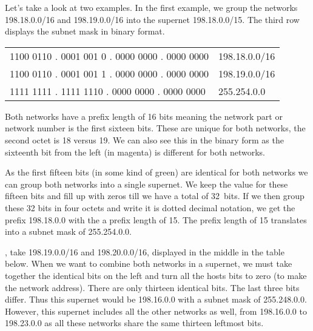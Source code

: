 Let's take a look at two examples.
In the first example, we group the networks 198.18.0.0/16 and 198.19.0.0/16 into the supernet 198.18.0.0/15.
The third row displays the subnet mask in binary format.

\begin{center}
\tosfstyle
\begin{tabular}{@{}l@{\qquad}l@{}}
\color{spot1} 1100 0110 . 0001 001\color{spot2} 0 . 0000 0000 . 0000 0000 & 198.18.0.0/16 \\
\color{spot1} 1100 0110 . 0001 001\color{spot2} 1 . 0000 0000 . 0000 0000 & 198.19.0.0/16 \\
\hline
\textcolor{spot1}{1111 1111 . 1111 111}0 . 0000 0000 . 0000 0000 & 255.254.0.0 \\
\end{tabular}
\end{center}

Both networks have a prefix length of 16 bits meaning the network part or network number is the first sixteen bits.
These are unique for both networks, the second octet is 18 versus 19.
We can also see this in the binary form as the sixteenth bit from the left (in \textcolor{spot2}{magenta}) is different for both networks.

As the first fifteen bits (in \textcolor{spot1}{some kind of green}) are identical for both networks we can group both networks into a single supernet.
We keep the value for these fifteen bits and fill up with zeros till we have a total of 32~bits.
If we then group these 32 bits in four octets and write it is dotted decimal notation, we get the prefix 198.18.0.0 with the a prefix length of 15.
The prefix length of 15 translates into a subnet mask of 255.254.0.0.

, take 198.19.0.0/16 and 198.20.0.0/16, displayed in the middle in the table below.
When we want to combine both networks in a supernet, we must take together the identical bits on the left and turn all the hosts bits to zero (to make the network address).
There are only thirteen identical bits. The last three bits differ.
Thus this supernet would be 198.16.0.0 with a subnet mask of 255.248.0.0.
However, this supernet includes all the other networks as well, from 198.16.0.0 to 198.23.0.0 as all these networks share the same thirteen leftmost bits.





